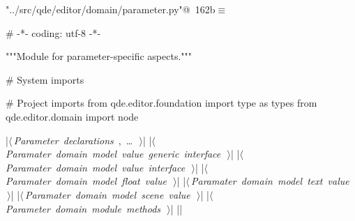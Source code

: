 \documentclass[%
    a4paper,    %
    justified,  %
    nobib,      %
    openany     %
]{tufte-book}
\begin{document}
\begin{flushleft} \small
\begin{minipage}{\linewidth}\label{scrap179}\raggedright\small
{} \verb@"../src/qde/editor/domain/parameter.py"@\nobreak\ {\footnotesize {162b}}$\equiv$
\vspace{-1ex}
\begin{pythoncode}
# -*- coding: utf-8 -*-

"""Module for parameter-specific aspects."""

# System imports

# Project imports
from qde.editor.foundation import type as types
from qde.editor.domain import node

|\hbox{$\langle\,${\itshape Parameter declarations}\nobreak\ {\footnotesize {}, \ldots\ }$\,\rangle$}|
|\hbox{$\langle\,${\itshape Paramater domain model value generic interface}\nobreak\ {\footnotesize {}}$\,\rangle$}|
|\hbox{$\langle\,${\itshape Paramater domain model value interface}\nobreak\ {\footnotesize {}}$\,\rangle$}|
|\hbox{$\langle\,${\itshape Paramater domain model float value}\nobreak\ {\footnotesize {}}$\,\rangle$}|
|\hbox{$\langle\,${\itshape Paramater domain model text value}\nobreak\ {\footnotesize {}}$\,\rangle$}|
|\hbox{$\langle\,${\itshape Paramater domain model scene value}\nobreak\ {\footnotesize {}}$\,\rangle$}|
|\hbox{$\langle\,${\itshape Parameter domain module methods}\nobreak\ {\footnotesize {}}$\,\rangle$}|
|\NWsep|
\end{pythoncode}
\vspace{1.5ex}
\footnotesize
\begin{list}{}{\setlength{\itemsep}{-\parsep}\setlength{\itemindent}{-\leftmargin}}

\item{}
\end{list}
\end{minipage}\vspace{4ex}
\end{flushleft}
\end{document}
